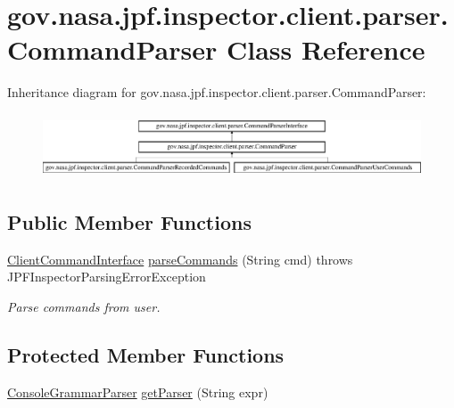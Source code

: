 \hypertarget{classgov_1_1nasa_1_1jpf_1_1inspector_1_1client_1_1parser_1_1_command_parser}{}\section{gov.\+nasa.\+jpf.\+inspector.\+client.\+parser.\+Command\+Parser Class Reference}
\label{classgov_1_1nasa_1_1jpf_1_1inspector_1_1client_1_1parser_1_1_command_parser}
Inheritance diagram for gov.\+nasa.\+jpf.\+inspector.\+client.\+parser.\+Command\+Parser\+:\begin{figure}[H]
\begin{center}
\leavevmode
\includegraphics[height=1.935484cm]{classgov_1_1nasa_1_1jpf_1_1inspector_1_1client_1_1parser_1_1_command_parser}
\end{center}
\end{figure}
\subsection*{Public Member Functions}
\begin{DoxyCompactItemize}
\item 
\hyperlink{interfacegov_1_1nasa_1_1jpf_1_1inspector_1_1client_1_1_client_command_interface}{Client\+Command\+Interface} \hyperlink{interfacegov_1_1nasa_1_1jpf_1_1inspector_1_1client_1_1parser_1_1_command_parser_interface_a14ea3eaa90add073b3248a9792a26ca9}{parse\+Commands} (String cmd)  throws J\+P\+F\+Inspector\+Parsing\+Error\+Exception
\begin{DoxyCompactList}\small\item\em Parse commands from user. \end{DoxyCompactList}\end{DoxyCompactItemize}
\subsection*{Protected Member Functions}
\begin{DoxyCompactItemize}
\item 
\hyperlink{classgov_1_1nasa_1_1jpf_1_1inspector_1_1client_1_1parser_1_1_console_grammar_parser}{Console\+Grammar\+Parser} \hyperlink{classgov_1_1nasa_1_1jpf_1_1inspector_1_1client_1_1parser_1_1_command_parser_a4f3a71d89c26fff8ef0f3aa1d5c037be}{get\+Parser} (String expr)
\end{DoxyCompactItemize}


